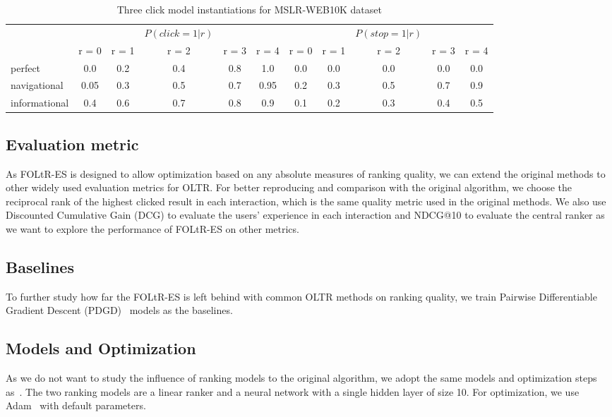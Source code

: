 \begin{table}
	\caption{Three click model instantiations for MSLR-WEB10K dataset}
	\label{table:3:MSLR-WEB10K}
	\centering
	\begin{tabular}{l c c c c c c c c c c}
		\hline
		&&&$P(click = 1 | r)$ &&&&& $P(stop = 1 | r)$  && \\
		& r = 0&  r = 1  & r = 2 & r = 3 & r = 4 & r = 0&  r = 1  & r = 2 & r = 3 & r = 4\\
		\midrule
		perfect  &   0.0  &    0.2  &   0.4  & 0.8 & 1.0 & 0.0 & 0.0 & 0.0 & 0.0 & 0.0 \\
		navigational  &  0.05  &   0.3  &    0.5  & 0.7 & 0.95 & 0.2  & 0.3  & 0.5  & 0.7 & 0.9  \\
		informational  &   0.4 &   0.6  &   0.7 & 0.8 & 0.9  & 0.1  & 0.2 & 0.3 & 0.4 & 0.5 \\
		\hline
	\end{tabular}
\end{table}

\subsection{Evaluation metric}
As FOLtR-ES is designed to allow optimization based on any absolute measures of ranking quality, we can extend the original methods to other widely used evaluation metrics for OLTR. For better reproducing and comparison with the original algorithm, we choose the reciprocal rank of the highest clicked result in each interaction, which is the same quality metric used in the original methods. We also use Discounted Cumulative Gain (DCG) to evaluate the users' experience in each interaction and NDCG@10 to evaluate the central ranker as we want to explore the performance of FOLtR-ES on other metrics.

\subsection{Baselines}
To further study how far the FOLtR-ES is left behind with common OLTR methods on ranking quality, we train Pairwise Differentiable Gradient Descent (PDGD)~\cite{oosterhuis2018differentiable} models as the baselines.

\subsection{Models and Optimization}
As we do not want to study the influence of ranking models to the original algorithm, we adopt the same models and optimization steps as~\cite{kharitonov2019federated}. The two ranking models are a linear ranker and a neural network with a single hidden layer of size 10. For optimization, we use Adam~\cite{kingma2014adam} with default parameters.


